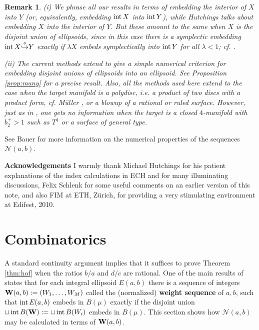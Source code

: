 \documentclass[11pt]{amsart}
\newcommand{\1}{{{\mathchoice {\rm 1\mskip-4mu l} {\rm 1\mskip-4mu l}
{\rm 1\mskip-4.5mu l} {\rm 1\mskip-5mu l}}}}
\newcommand{\bW} {{\bf W}}
\newcommand{\intt}{{\rm int\,}}
\newcommand{\la}{{\lambda}}
\newcommand{\Nn}{{\mathcal N}}
\newcommand{\se} {{\stackrel{s}\hookrightarrow}}
\newtheorem{rmk}[theorem]{Remark}
\numberwithin{figure}{section}
\numberwithin{equation}{section}
\newcommand{\MS}{{\medskip}}
\newcommand{\NI}{{\noindent}}
\begin{document}
\begin{rmk}\rm  (i)
We phrase all our  results in terms of  embedding the interior of $X$ into $Y$ (or, equivalently, embedding $\intt X$ into $\intt Y$), while Hutchings talks about embedding $X$ into the interior of $Y$. But these amount to the same  when $X$ is the disjoint union of ellipsoids, since in this case there is a symplectic embedding $\intt X \se Y$ exactly if  $\la X$ embeds symplectically into $\intt Y$ for all $\la<1$; cf. \cite[Cor.~1.5]{M}.\MS

\NI (ii) The current 
methods extend to give a simple numerical criterion for embedding  disjoint unions of ellipsoids  into an ellipsoid. See Proposition \ref{prop:many} for a precise result.
Also, all the methods used here extend to the case when the target manifold is a polydisc,
i.e. a product of
two discs with a product form, cf. M\"uller \cite{DoM}, or a  blowup of a rational or ruled surface.
 However, just as in \cite{Mdef}, one gets no information when the target is a closed $4$-manifold with $b_2^+>1$ such as $T^4$ or a surface of general type.
\end{rmk}

See Bauer \cite{Bau} for more information on the numerical properties  of the sequences $\Nn(a,b)$.
\MS

\NI {\bf Acknowledgements}  I warmly thank Michael Hutchings for his patient explanations of the index calculations in ECH and for many illuminating discussions, Felix Schlenk for some useful comments on an earlier version of this note, and also FIM at ETH, Z\"urich, for 
providing a very stimulating environment at Edifest, 2010.

\section{Combinatorics}


A standard continuity argument implies that it suffices to prove
Theorem \ref{thm:hof} when the ratios $b/a$ and $d/c$ are rational.
One of the
main results of \cite{M} states 
that for each integral ellipsoid $E(a,b)$ 
there is a sequence of integers $\bW(a,b): = (W_1,\dots,W_M)$ called the (normalized) {\bf weight sequence} of $a,b$, such that $\intt E(a,b)$ embeds in  $B(\mu)$ exactly if the disjoint union $\sqcup \,\intt B(\bW): = \sqcup \,\intt B(W_i)$ embeds in $B(\mu)$.  This section  shows  how $\Nn(a,b)$ may be calculated in terms of $\bW(a,b)$.
\end{document}

